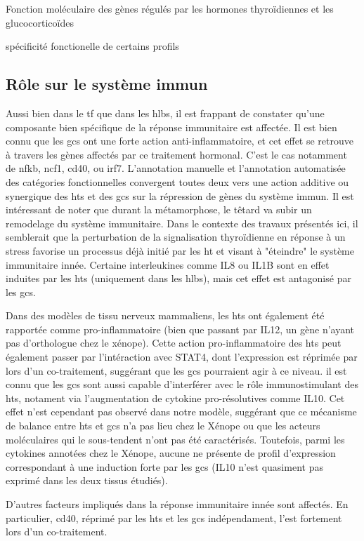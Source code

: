 \documentclass[../main.tex]{subfiles}
\begin{document}
\begin{chapter}{Fonction moléculaire des gènes régulés par les hormones thyroïdiennes et les glucocorticoïdes}
\begin{section}{spécificité fonctionelle de certains profils}
\subsection{Rôle sur le système immun}
Aussi bien dans le \gls{tf} que dans les \glspl{hlb}, il est frappant de constater qu'une composante bien spécifique de la réponse immunitaire est affectée.
Il est bien connu que les \glspl{gc} ont une forte action anti-inflammatoire, et cet effet se retrouve à travers les gènes affectés par ce traitement hormonal.
C'est le cas notamment de \gls{nfkb}, \gls{ncf1}, \gls{cd40}, ou \gls{irf7}.
L'annotation manuelle et l'annotation automatisée des catégories fonctionnelles convergent toutes deux vers une action additive ou synergique des \glspl{ht} et des \glspl{gc} sur la répression de gènes du système immun.
Il est intéressant de noter que durant la métamorphose, le têtard va subir un remodelage du système immunitaire.
Dans le contexte des travaux présentés ici, il semblerait que la perturbation de la signalisation thyroïdienne en réponse à un stress favorise un processus déjà initié par les \gls{ht} et visant à "éteindre" le système immunitaire innée.
Certaine interleukines comme IL8 ou IL1B sont en effet induites par les \glspl{ht} (uniquement dans les \glspl{hlb}), mais cet effet est antagonisé par les \glspl{gc}.
\par
Dans des modèles de tissu nerveux mammaliens, les \glspl{ht} ont également été rapportée comme pro-inflammatoire \citep{Tamura1999,Montesinos2012} (bien que passant par IL12, un gène n'ayant pas d'orthologue chez le xénope).
Cette action pro-inflammatoire des \glspl{ht} peut également passer par l'intéraction avec STAT4, dont l'expression est réprimée par lors d'un co-traitement, suggérant que les \glspl{gc} pourraient agir à ce niveau.
il est connu que les \glspl{gc} sont aussi capable d'interférer avec le rôle immunostimulant des \glspl{ht}, notament via l'augmentation de cytokine pro-résolutives comme IL10.
Cet effet n'est cependant pas observé dans notre modèle, suggérant que ce mécanisme de balance entre \glspl{ht} et \glspl{gc} n'a pas lieu chez le Xénope ou que les acteurs moléculaires qui le sous-tendent n'ont pas été caractérisés.
Toutefois, parmi les cytokines annotées chez le Xénope, aucune ne présente de profil d'expression correspondant à une induction forte par les \glspl{gc} (IL10 n'est quasiment pas exprimé dans les deux tissus étudiés).
\par
D'autres facteurs impliqués dans la réponse immunitaire innée sont affectés.
En particulier, \gls{cd40}, réprimé par les \glspl{ht} et les \glspl{gc} indépendament, l'est fortement lors d'un co-traitement.

\end{section}
\end{chapter}
\end{document}
